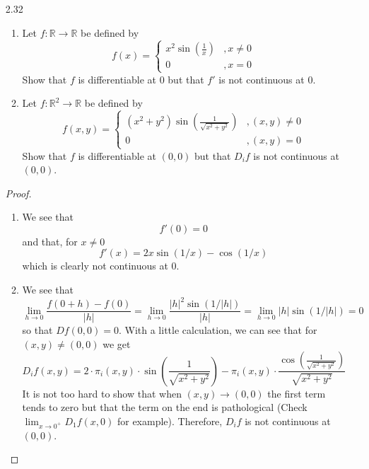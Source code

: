 \begin{enumerate}
    \item[2.32]
    \begin{enumerate}
        \item Let \( f: \mathbb{R} \rightarrow \mathbb{R} \) be defined by
        \[
        f(x) = \begin{cases} x^2\sin\left( \frac{1}{x} \right) &, x \neq 0 \\ 0 &, x = 0 \end{cases}
        \]
        Show that \( f \) is differentiable at \( 0 \) but that \( f' \) is not continuous at \( 0 \).
    
        \item Let \( f: \mathbb{R}^2 \rightarrow \mathbb{R} \) be defined by
        \[
        f(x,y) = \begin{cases} (x^2+y^2) \sin \left( \frac{1}{\sqrt{x^2+y^2}} \right) &, (x,y) \neq 0  \\ 0 &, (x,y) = 0 \end{cases}
        \]
        Show that \( f \) is differentiable at \( (0,0) \) but that \( D_if \) is not continuous at \( (0,0) \). 
    \end{enumerate}
    \begin{proof}
    \begin{enumerate}
        \item We see that
        \[
        f'(0) = 0
        \]
        and that, for \( x \neq 0 \)
        \[
        f'(x) = 2x\sin(1/x)-\cos(1/x)
        \]
        which is clearly not continuous at \( 0 \).
        
        \item We see that
        \[
        \lim_{h \rightarrow 0} \frac{f(0+h)-f(0)}{\left| h \right|} = \lim_{h \rightarrow 0} \frac{\left|h\right|^2 \sin\left( 1/\left|h\right| \right)}{\left| h \right|} = \lim_{h \rightarrow 0} \left| h \right| \sin(1/\left|h \right|) = 0
        \]
        so that \( Df(0,0) = 0 \). With a little calculation, we can see that for \( (x,y) \neq (0,0) \) we get
        \[
        D_if(x,y) = 2 \cdot \pi_i(x,y) \cdot \sin\left( \frac{1}{\sqrt{x^2+y^2}} \right)-\pi_i(x,y) \cdot \frac{\cos\left( \frac{1}{\sqrt{x^2+y^2}} \right)}{\sqrt{x^2+y^2}}
        \]
        It is not too hard to show that when \( (x,y) \rightarrow (0,0) \) the first term tends to zero but that the term on the end is pathological (Check \( \lim_{x \rightarrow 0^+} D_1f(x,0) \) for example). Therefore, \( D_if \) is not continuous at \( (0,0) \). 

    \end{enumerate}
    \end{proof}
    

\end{enumerate}
